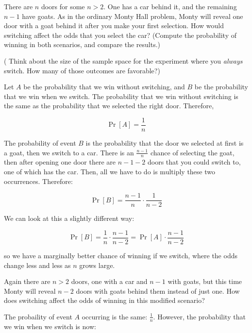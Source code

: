 \documentclass[11pt]{article}
\begin{document}
\begin{Parts}
    \Part There are $n$ doors for some $n > 2$. One has a car behind it, and the
        remaining $n-1$ have goats. As in the ordinary Monty Hall problem, Monty
        will reveal one door with a goat behind it after you make your first
        selection. How would switching affect the odds that you select the car?
        (Compute the probability of winning in both scenarios, and compare the results.)

        ( Think about the size of the sample space for the
        experiment where you \textit{always} switch. How many of those outcomes
        are favorable?)

        \begin{solution}
            Let $A$ be the probability that we win without switching, and $B$ be the probability that we win when we switch. The probability that we win without switching is the same as the probability that we selected the right door. Therefore, 

            \[ \Pr[A] = \frac{1}{n}\]

            The probability of event $B$ is the probability that the door we selected at first is a goat, then we switch to a car. There is an $\frac{n-1}{n}$ chance of selecting the goat, then after opening one door there are $n - 1 - 2$ doors that you could switch to, one of which has the car. Then, all we have to do is multiply these two occurrences. Therefore: 

            \[ \Pr[B] = \frac{n-1}{n} \cdot \frac{1}{n-2}\] 

            We can look at this a slightly different way: 

            \[ \Pr[B] = \frac{1}{n} \cdot \frac{n-1}{n-2} = \Pr[A] \cdot \frac{n-1}{n-2}\]

            so we have a marginally better chance of winning if we switch, where the odds change less and less as $n$ grows large.
        \end{solution}

    \Part Again there are $n > 2$ doors, one with a car and $n-1$ with goats, but
        this time Monty will reveal $n-2$ doors with goats behind them instead
        of just one. How does switching affect the odds of winning in this
        modified scenario?

        \begin{solution}
            The probaility of event $A$ occurring is the same: $\frac 1n$. However, the probability that we win when we switch is now: 


\end{solution}
\end{Parts}
\end{document}
